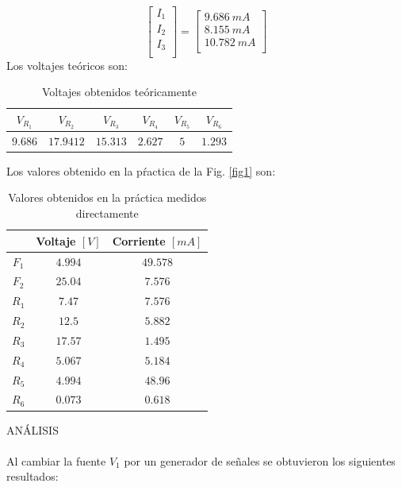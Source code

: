 \documentclass[twocolumn]{IEEEtran}
\begin{document}
\begin{equation}
\left[ \begin{array}{l}
 {I_1} \\ 
 {I_2} \\ 
 {I_3} \\ 
 \end{array} \right] = \left[ \begin{array}{l}
 9.686 \ mA\\ 
 8.155 \ mA\\ 
 10.782 \ mA\\ 
 \end{array} \right]
\label{ecu7}
\end{equation}
\noindent
Los voltajes teóricos son:

\begin{table}[H]
	\centering
\begin{tabular}[c]{|c|c|c|c|c|c|} \hline
$V_{R_1}$ & $V_{R_2}$ & $V_{R_3}$ & $V_{R_4}$ & $V_{R_5}$ & $V_{R_6}$ \\ \hline
$9.686$ & $17.9412$ & $15.313$ & $2.627$ & $5$ & $1.293$ \\ \hline
\end{tabular}
	\caption{Voltajes obtenidos teóricamente}
	\label{tab1}
\end{table}
\noindent
Los valores obtenido en la pŕactica de la Fig. \ref{fig1} son:
\begin{table}[H]
	\centering
\begin{tabular}[c]{|c||c|c|} \hline
 & Voltaje $[V]$ & Corriente $[mA]$ \\ \hline
$F_1$ & $4.994$ & $49.578$ \\ \hline
$F_2$ & $25.04$ & $7.576$ \\ \hline
$R_1$ & $7.47$ & $7.576$ \\ \hline
$R_2$ & $12.5$ & $5.882$ \\ \hline
$R_3$ & $17.57$ & $1.495$ \\ \hline
$R_4$ & $5.067$ & $5.184$\\ \hline
$R_5$ & $4.994$ & $48.96$ \\ \hline
$R_6$ & $0.073$ & $0.618$ \\ \hline
\end{tabular}
	\caption{Valores obtenidos en la práctica medidos directamente}
	\label{tab2}
\end{table}
\noindent
ANÁLISIS
\\\\
Al cambiar la fuente $V_1$ por un generador de señales se obtuvieron los siguientes resultados:
\end{document}
